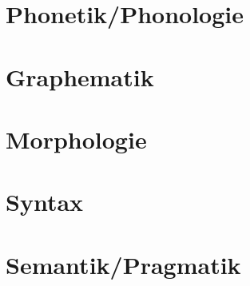 \documentclass[10pt,handout]{beamer}
\begin{document}
\section{Phonetik/Phonologie}



\section{Graphematik}



\section{Morphologie}



\section{Syntax}



\section{Semantik/Pragmatik}







\end{document}
